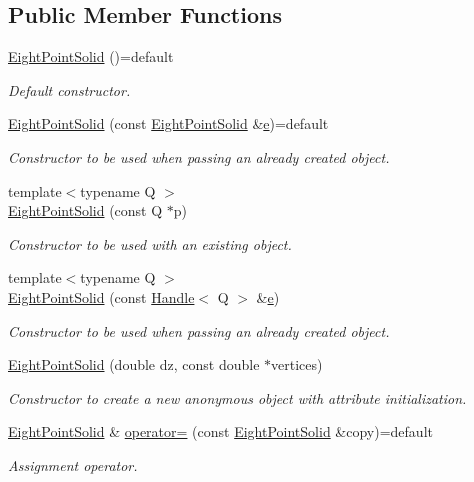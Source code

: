 \subsection*{Public Member Functions}
\begin{DoxyCompactItemize}
\item 
\hyperlink{class_d_d4hep_1_1_geometry_1_1_eight_point_solid_a2d5b6ef21dfa195aa13cef05f29be4dc}{Eight\+Point\+Solid} ()=default
\begin{DoxyCompactList}\small\item\em Default constructor. \end{DoxyCompactList}\item 
\hyperlink{class_d_d4hep_1_1_geometry_1_1_eight_point_solid_af1f0723b951f52026f278cc2e28ff37d}{Eight\+Point\+Solid} (const \hyperlink{class_d_d4hep_1_1_geometry_1_1_eight_point_solid}{Eight\+Point\+Solid} \&\hyperlink{_volumes_8cpp_a8a9a1f93e9b09afccaec215310e64142}{e})=default
\begin{DoxyCompactList}\small\item\em Constructor to be used when passing an already created object. \end{DoxyCompactList}\item 
{\footnotesize template$<$typename Q $>$ }\\\hyperlink{class_d_d4hep_1_1_geometry_1_1_eight_point_solid_a4e096f2952f95ff82544b4149e740f50}{Eight\+Point\+Solid} (const Q $\ast$p)
\begin{DoxyCompactList}\small\item\em Constructor to be used with an existing object. \end{DoxyCompactList}\item 
{\footnotesize template$<$typename Q $>$ }\\\hyperlink{class_d_d4hep_1_1_geometry_1_1_eight_point_solid_ae9f57f10fa7c2fc5f3f5e43732de4c00}{Eight\+Point\+Solid} (const \hyperlink{class_d_d4hep_1_1_handle}{Handle}$<$ Q $>$ \&\hyperlink{_volumes_8cpp_a8a9a1f93e9b09afccaec215310e64142}{e})
\begin{DoxyCompactList}\small\item\em Constructor to be used when passing an already created object. \end{DoxyCompactList}\item 
\hyperlink{class_d_d4hep_1_1_geometry_1_1_eight_point_solid_a31cadc86111d6b1cfcd6767c33c64f73}{Eight\+Point\+Solid} (double dz, const double $\ast$vertices)
\begin{DoxyCompactList}\small\item\em Constructor to create a new anonymous object with attribute initialization. \end{DoxyCompactList}\item 
\hyperlink{class_d_d4hep_1_1_geometry_1_1_eight_point_solid}{Eight\+Point\+Solid} \& \hyperlink{class_d_d4hep_1_1_geometry_1_1_eight_point_solid_af7ec0d88c449331fea5939435c22cedd}{operator=} (const \hyperlink{class_d_d4hep_1_1_geometry_1_1_eight_point_solid}{Eight\+Point\+Solid} \&copy)=default
\begin{DoxyCompactList}\small\item\em Assignment operator. \end{DoxyCompactList}\end{DoxyCompactItemize}
